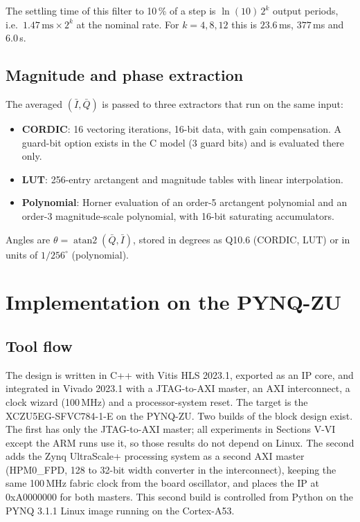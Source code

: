 \documentclass[journal]{IEEEtran}
\begin{document}
The settling time of this filter to 10\,\% of a step is $\ln(10)\,2^k$ output periods, i.e.\ $1.47\,\mathrm{ms}\times2^k$ at the nominal rate. For $k=4,8,12$ this is $23.6$\,ms, $377$\,ms and $6.0$\,s.

\subsection{Magnitude and phase extraction}
The averaged $(\bar I,\bar Q)$ is passed to three extractors that run on the same input:
\begin{itemize}
\item \textbf{CORDIC}: 16 vectoring iterations, 16-bit data, with gain compensation. A guard-bit option exists in the C model (3 guard bits) and is evaluated there only.
\item \textbf{LUT}: 256-entry arctangent and magnitude tables with linear interpolation.
\item \textbf{Polynomial}: Horner evaluation of an order-5 arctangent polynomial and an order-3 magnitude-scale polynomial, with 16-bit saturating accumulators.
\end{itemize}
Angles are $\theta=\operatorname{atan2}(\bar Q,\bar I)$, stored in degrees as Q10.6 (CORDIC, LUT) or in units of $1/256^\circ$ (polynomial).

\section{Implementation on the PYNQ-ZU}
\subsection{Tool flow}
The design is written in C++ with Vitis HLS 2023.1, exported as an IP core, and integrated in Vivado 2023.1 with a JTAG-to-AXI master, an AXI interconnect, a clock wizard (100\,MHz) and a processor-system reset. The target is the XCZU5EG-SFVC784-1-E on the PYNQ-ZU. Two builds of the block design exist. The first has only the JTAG-to-AXI master; all experiments in Sections V-VI except the ARM runs use it, so those results do not depend on Linux. The second adds the Zynq UltraScale+ processing system as a second AXI master (HPM0\_FPD, 128 to 32-bit width converter in the interconnect), keeping the same 100\,MHz fabric clock from the board oscillator, and places the IP at 0xA0000000 for both masters. This second build is controlled from Python on the PYNQ 3.1.1 Linux image running on the Cortex-A53.
\end{document}
